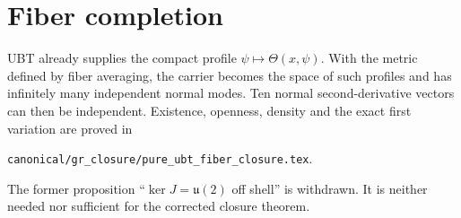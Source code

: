 \documentclass[11pt,a4paper]{article}
\begin{document}
\section{Fiber completion}

UBT already supplies the compact profile $\psi\mapsto\Theta(x,\psi)$.  With the
metric defined by fiber averaging, the carrier becomes the space of such
profiles and has infinitely many independent normal modes.  Ten normal
second-derivative vectors can then be independent.  Existence, openness,
density and the exact first variation are proved in
\begin{center}
\texttt{canonical/gr\_closure/pure\_ubt\_fiber\_closure.tex}.
\end{center}

\begin{tcolorbox}[colback=yellow!8!white,colframe=orange!75!black,title=Status]
The former proposition ``$\ker J=\mathfrak u(2)$ off shell'' is withdrawn.  It
is neither needed nor sufficient for the corrected closure theorem.
\end{tcolorbox}
\end{document}
